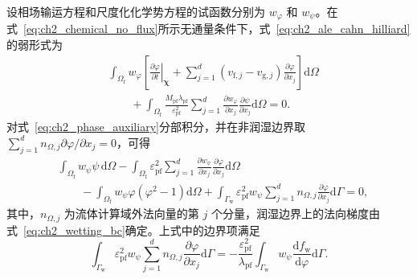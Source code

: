设相场输运方程和尺度化化学势方程的试函数分别为 $w_{\varphi}$ 和 $w_{\psi}$。在式~\eqref{eq:ch2_chemical_no_flux}所示无通量条件下，式~\eqref{eq:ch2_ale_cahn_hilliard}的弱形式为
\begin{equation}
\begin{aligned}
&\int_{\Omega_{\mathrm f}}
w_{\varphi}
\left[
\left.
\frac{\partial\varphi}{\partial t}
\right|_{\boldsymbol{\chi}}
+
\sum_{j=1}^{d}
\left(v_{\mathrm f,j}-v_{\mathrm g,j}\right)
\frac{\partial\varphi}{\partial x_j}
\right]
\mathrm d\Omega
\\
&\qquad
+
\int_{\Omega_{\mathrm f}}
\frac{M_{\mathrm{pf}}\lambda_{\mathrm{pf}}}
{\varepsilon_{\mathrm{pf}}^2}
\sum_{j=1}^{d}
\frac{\partial w_{\varphi}}{\partial x_j}
\frac{\partial\psi}{\partial x_j}
\mathrm d\Omega
=0.
\end{aligned}
\label{eq:ch2_weak_phase_transport}
\end{equation}
对式~\eqref{eq:ch2_phase_auxiliary}分部积分，并在非润湿边界取 $\sum_{j=1}^{d}n_{\Omega,j}\partial\varphi/\partial x_j=0$，可得
\begin{equation}
\begin{aligned}
&\int_{\Omega_{\mathrm f}}
w_{\psi}\psi\,\mathrm d\Omega
-
\int_{\Omega_{\mathrm f}}
\varepsilon_{\mathrm{pf}}^2
\sum_{j=1}^{d}
\frac{\partial w_{\psi}}{\partial x_j}
\frac{\partial\varphi}{\partial x_j}
\mathrm d\Omega
\\
&\qquad
-
\int_{\Omega_{\mathrm f}}
w_{\psi}\varphi\left(\varphi^2-1\right)
\mathrm d\Omega
+
\int_{\Gamma_{\mathrm w}}
\varepsilon_{\mathrm{pf}}^2
w_{\psi}
\sum_{j=1}^{d}n_{\Omega,j}
\frac{\partial\varphi}{\partial x_j}
\mathrm d\Gamma
=0,
\end{aligned}
\label{eq:ch2_weak_phase_auxiliary}
\end{equation}
其中，$n_{\Omega,j}$ 为流体计算域外法向量的第 $j$ 个分量，润湿边界上的法向梯度由式~\eqref{eq:ch2_wetting_bc}确定。上式中的边界项满足
\begin{equation}
\int_{\Gamma_{\mathrm w}}
\varepsilon_{\mathrm{pf}}^2
w_{\psi}
\sum_{j=1}^{d}n_{\Omega,j}
\frac{\partial\varphi}{\partial x_j}
\mathrm d\Gamma
=
-
\frac{\varepsilon_{\mathrm{pf}}^2}{\lambda_{\mathrm{pf}}}
\int_{\Gamma_{\mathrm w}}
w_{\psi}
\frac{\mathrm d f_{\mathrm w}}{\mathrm d\varphi}
\mathrm d\Gamma.
\label{eq:ch2_weak_wetting_term}
\end{equation}

